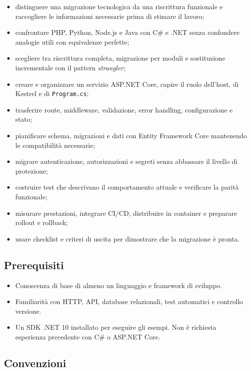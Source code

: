 \documentclass[
  italian,
  10pt,
]{book}
\providecommand{\tightlist}{%
  \setlength{\itemsep}{0pt}\setlength{\parskip}{0pt}}
\begin{document}
\begin{itemize}
\tightlist
\item
  distinguere una migrazione tecnologica da una riscrittura funzionale e
  raccogliere le informazioni necessarie prima di stimare il lavoro;
\item
  confrontare PHP, Python, Node.js e Java con C\# e .NET senza
  confondere analogie utili con equivalenze perfette;
\item
  scegliere tra riscrittura completa, migrazione per moduli e
  sostituzione incrementale con il pattern \emph{strangler};
\item
  creare e organizzare un servizio ASP.NET Core, capire il ruolo
  dell'host, di Kestrel e di \texttt{Program.cs};
\item
  trasferire route, middleware, validazione, error handling,
  configurazione e stato;
\item
  pianificare schema, migrazioni e dati con Entity Framework Core
  mantenendo le compatibilità necessarie;
\item
  migrare autenticazione, autorizzazioni e segreti senza abbassare il
  livello di protezione;
\item
  costruire test che descrivano il comportamento attuale e verificare la
  parità funzionale;
\item
  misurare prestazioni, integrare CI/CD, distribuire in container e
  preparare rollout e rollback;
\item
  usare checklist e criteri di uscita per dimostrare che la migrazione è
  pronta.
\end{itemize}

\subsection{Prerequisiti}\label{prerequisiti}

\begin{itemize}
\tightlist
\item
  Conoscenza di base di almeno un linguaggio e framework di sviluppo.
\item
  Familiarità con HTTP, API, database relazionali, test automatici e
  controllo versione.
\item
  Un SDK .NET 10 installato per eseguire gli esempi. Non è richiesta
  esperienza precedente con C\# o ASP.NET Core.
\end{itemize}

\subsection{Convenzioni}\label{convenzioni}
\end{document}
